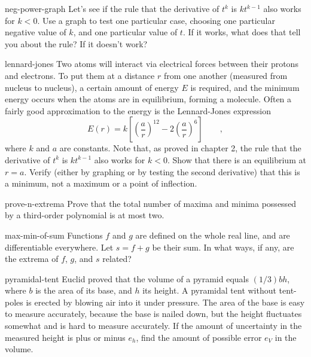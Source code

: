 \begin{hwsection}
\begin{hwwithsoln}{neg-power-graph}
Let's see if the rule that the derivative of $t^k$ is $kt^{k-1}$ also works for $k<0$.
Use a graph to test one particular case, choosing one particular negative value of $k$, and one 
particular value of $t$. If it works, what does that tell you about the rule? If it
doesn't work?
\end{hwwithsoln}

\begin{hwwithsoln}{lennard-jones}
Two atoms will interact via electrical forces between
their protons and electrons. To put them at a distance $r$ from one another (measured from
nucleus to nucleus), a certain amount of energy $E$ is required, and the minimum energy
occurs when the atoms are in equilibrium, forming a molecule. Often a fairly good approximation
to the energy is the Lennard-Jones expression
\begin{equation*}
  E(r) = k\left[\left(\frac{a}{r}\right)^{12}-2\left(\frac{a}{r}\right)^6\right] \qquad ,
\end{equation*}
where $k$ and $a$ are constants. Note that, as proved in chapter 2, the rule that
the derivative of $t^k$ is $kt^{k-1}$ also works for $k<0$.
Show that there is an equilibrium at $r=a$. Verify (either by graphing or by testing
the second derivative) that this is a minimum, not a maximum or a point of inflection.
\end{hwwithsoln}

\begin{hwwithsoln}{prove-n-extrema}
Prove that the total number of maxima and minima possessed by a third-order polynomial
is at most two.
\end{hwwithsoln}

\begin{hwwithsoln}{max-min-of-sum}
Functions $f$ and $g$ are defined on the whole real line, and are differentiable everywhere.
Let $s=f+g$ be their sum. In what ways, if any, are the extrema of $f$, $g$, and $s$ related?
\end{hwwithsoln}

\begin{hwwithsoln}{pyramidal-tent}
Euclid proved that the volume of a pyramid equals $(1/3)bh$, where $b$ is the area of its
base, and $h$ its height. A pyramidal tent without tent-poles is erected by blowing air
into it under pressure. The area of the base is easy to measure accurately, because the
base is nailed down, but the height fluctuates somewhat and is hard to measure accurately.
If the amount of uncertainty in the measured height is plus or minus $e_h$, find the
amount of possible error $e_V$ in the volume.
\end{hwwithsoln}


\end{hwsection}
